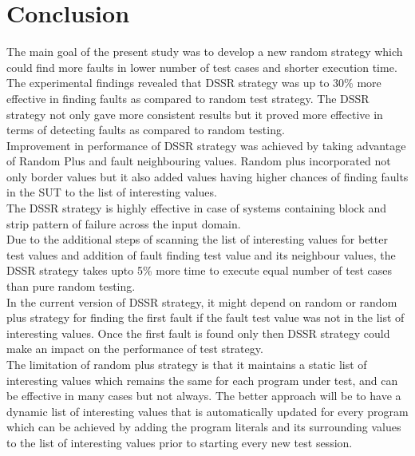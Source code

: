\section{Conclusion}

The main goal of the present study was to develop a new random strategy which could find more faults in lower number of test cases and shorter execution time. The experimental findings revealed that DSSR strategy was up to 30\% more effective in finding faults as compared to random test strategy. The DSSR strategy not only gave more consistent results but it proved more effective in terms of detecting faults as compared to random testing. \\

Improvement in performance of DSSR strategy was achieved by taking advantage of Random Plus and fault neighbouring values. Random plus incorporated not only border values but it also added values having higher chances of finding faults in the SUT to the list of interesting values.\\

The DSSR strategy is highly effective in case of systems containing block and strip pattern of failure across the input domain.\\

Due to the additional steps of scanning the list of interesting values for better test values and addition of fault finding test value and its neighbour values, the DSSR strategy takes upto 5\% more time to execute equal number of test cases than pure random testing. \\

In the current version of DSSR strategy, it might depend on random or random plus strategy for finding the first fault if the fault test value was not in the list of interesting values. Once the first fault is found only then DSSR strategy could make an impact on the performance of test strategy.\\

The limitation of random plus strategy is that it maintains a static list of interesting values which remains the same for each program under test, and can be effective in many cases but not always. The better approach will be to have a dynamic list of interesting values that is automatically updated for every program which can be achieved by adding the program literals and its surrounding values to the list of interesting values prior to starting every new test session.





